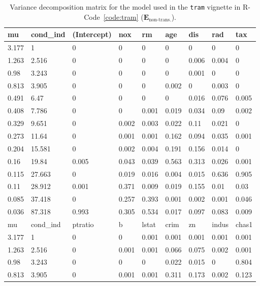 \documentclass[11pt,a4paper,twoside]{book}\usepackage[]{graphicx}\usepackage[]{xcolor}
\begin{document}
\begin{table}[h]\begin{center}
\caption{Variance decomposition matrix for the model used in the \texttt{tram} vignette in \textsf{R}-Code~\ref{code:tram} ($\boldsymbol{E}_\text{non-trans.}$).}\label{tab:vardecomp_tram}
\begingroup\footnotesize
\begin{tabular}{lllllllll}
  \toprule
 mu & cond\_ind & (Intercept) & nox & rm & age & dis & rad & tax \\ 
   \midrule
3.177 & 1 & 0 & 0 & 0 & 0 & 0 & 0 & 0 \\ 
  1.263 & 2.516 & 0 & 0 & 0 & 0 & 0.006 & 0.004 & 0 \\ 
  0.98 & 3.243 & 0 & 0 & 0 & 0 & 0.001 & 0 & 0 \\ 
  0.813 & 3.905 & 0 & 0 & 0 & 0.002 & 0 & 0.003 & 0 \\ 
  0.491 & 6.47 & 0 & 0 & 0 & 0 & 0.016 & 0.076 & 0.005 \\ 
  0.408 & 7.786 & 0 & 0 & 0.001 & 0.019 & 0.034 & 0.09 & 0.002 \\ 
  0.329 & 9.651 & 0 & 0.002 & 0.003 & 0.022 & 0.11 & 0.021 & 0 \\ 
  0.273 & 11.64 & 0 & 0.001 & 0.001 & 0.162 & 0.094 & 0.035 & 0.001 \\ 
  0.204 & 15.581 & 0 & 0.002 & 0.004 & 0.191 & 0.156 & 0.014 & 0 \\ 
  0.16 & 19.84 & 0.005 & 0.043 & 0.039 & 0.563 & 0.313 & 0.026 & 0.001 \\ 
  0.115 & 27.663 & 0 & 0.019 & 0.016 & 0.004 & 0.015 & 0.636 & 0.905 \\ 
  0.11 & 28.912 & 0.001 & 0.371 & 0.009 & 0.019 & 0.155 & 0.01 & 0.03 \\ 
  0.085 & 37.418 & 0 & 0.257 & 0.393 & 0.001 & 0.002 & 0.001 & 0.046 \\ 
  0.036 & 87.318 & 0.993 & 0.305 & 0.534 & 0.017 & 0.097 & 0.083 & 0.009 \\ 
   \midrule
mu & cond\_ind & ptratio & b & lstat & crim & zn & indus & chas1 \\ 
   \midrule
3.177 & 1 & 0 & 0 & 0.001 & 0.001 & 0.001 & 0.001 & 0.001 \\ 
  1.263 & 2.516 & 0 & 0.001 & 0.001 & 0.066 & 0.075 & 0.002 & 0.001 \\ 
  0.98 & 3.243 & 0 & 0 & 0 & 0.022 & 0.015 & 0 & 0.804 \\ 
  0.813 & 3.905 & 0 & 0.001 & 0.001 & 0.311 & 0.173 & 0.002 & 0.123 \\ 

\end{tabular}
\end{center}
\end{table}
\end{document}
